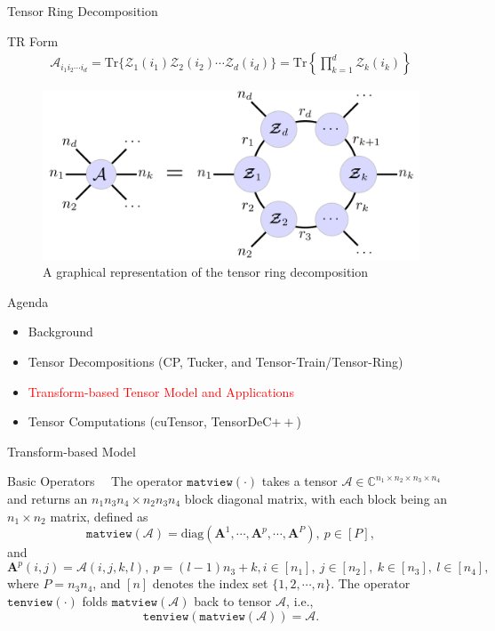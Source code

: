 \documentclass[t, 10pt, handout, aspectratio=169]{beamer}
\begin{document}
\begin{frame}{Tensor Ring Decomposition}
\large
\begin{block}{TR Form}
$$
\begin{aligned}
\mathcal{A}_{i_1i_2\cdots i_d}=\text{Tr}\{\mathcal{Z}_1(i_1)\mathcal{Z}_2(i_2)\cdots\mathcal{Z}_d(i_d)\}
=\text{Tr}\left\{\prod_{k=1}^{d}\mathcal{Z}_k(i_k)\right\}
\end{aligned}
$$
\end{block}
\normalsize
\begin{figure}
	\centering  
	\includegraphics[width=0.45\linewidth]{figs/tensor_ring_arch.png} \\
	A graphical representation of the tensor ring decomposition
	\label{fig:tensor_ring_arch}
\end{figure}
\end{frame}

\begin{frame}{Agenda}
\begin{itemize}
    \large \item {Background}
    \large \item {Tensor Decompositions (CP, Tucker, and Tensor-Train/Tensor-Ring)}
    \large \item \textcolor{red}{Transform-based Tensor Model and Applications}
    \large \item{Tensor Computations (cuTensor, TensorDeC$++$)}
\end{itemize}
\end{frame}


\begin{frame}{Transform-based Model}
\begin{block}{Basic Operators}
~~The operator $\texttt{matview}(\cdot)$ takes a tensor $\mathcal{A}\in\mathbb{C}^{n_1\times n_2\times n_3\times n_4}$ and returns an $n_1n_3n_4\times n_2n_3n_4$ block diagonal matrix, with each block being an $n_1\times n_2$ matrix, defined as
$$
\texttt{matview}(\mathcal{A})=\text{diag}(\mathbf{A}^1, \cdots, \mathbf{A}^p, \cdots, \mathbf{A}^P), ~ p\in [P], 
$$
and
$$
\mathbf{A}^p(i,j)=\mathcal{A}(i,j,k,l), ~p=(l-1)n_3+k, i\in[n_1], ~j\in[n_2], ~k\in [n_3], ~l\in[n_4],
$$
where $P=n_3n_4$, and $[n]$ denotes the index set $\{1, 2, \cdots, n\}$. The operator $\texttt{tenview}(\cdot)$ folds $\texttt{matview}(\mathcal{A})$ back to tensor $\mathcal{A}$, i.e.,
$$
\texttt{tenview}(\texttt{matview}(\mathcal{A})) = \mathcal{A}.
$$
\end{block}
\end{frame}
\end{document}
